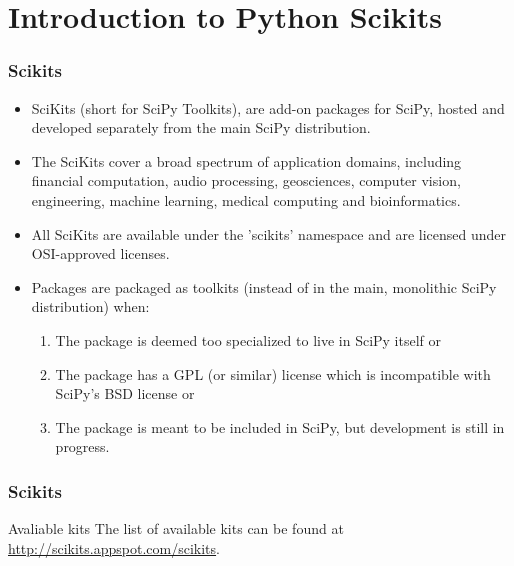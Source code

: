 \documentclass[10pt, colorlinks]{beamer}
\begin{document}
\section{Introduction to Python Scikits}
\begin{frame}[fragile]\frametitle{Scikits}

\begin{itemize}
    \item SciKits (short for SciPy Toolkits), are add-on packages for SciPy, hosted and developed separately from the main SciPy distribution.
    \item The SciKits cover a broad spectrum of application domains, including financial computation, audio processing, geosciences, computer vision, engineering, machine learning, medical computing and bioinformatics.
    \item All SciKits are available under the 'scikits' namespace and are licensed under OSI-approved licenses.
    \item Packages are packaged as toolkits (instead of in the main, monolithic SciPy distribution) when:
\begin{enumerate}
    \item The package is deemed too specialized to live in SciPy itself or

    \item The package has a GPL (or similar) license which is incompatible with SciPy's BSD license or

    \item The package is meant to be included in SciPy, but development is still in progress.
\end{enumerate}
\end{itemize}
\end{frame}

\begin{frame}[fragile]\frametitle{Scikits}

\begin{block}{Avaliable kits}
The list of available kits can be found at  \\ 
    \centering \href{http://scikits.appspot.com/scikits}{http://scikits.appspot.com/scikits}.
\end{block}

\end{frame}
\end{document}
